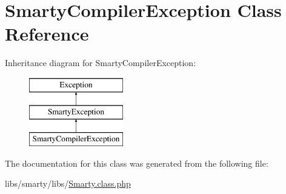 \hypertarget{class_smarty_compiler_exception}{}\section{Smarty\+Compiler\+Exception Class Reference}
\label{class_smarty_compiler_exception}
Inheritance diagram for Smarty\+Compiler\+Exception\+:\begin{figure}[H]
\begin{center}
\leavevmode
\includegraphics[height=3.000000cm]{class_smarty_compiler_exception}
\end{center}
\end{figure}


The documentation for this class was generated from the following file\+:\begin{DoxyCompactItemize}
\item 
libs/smarty/libs/\hyperlink{_smarty_8class_8php}{Smarty.\+class.\+php}\end{DoxyCompactItemize}
